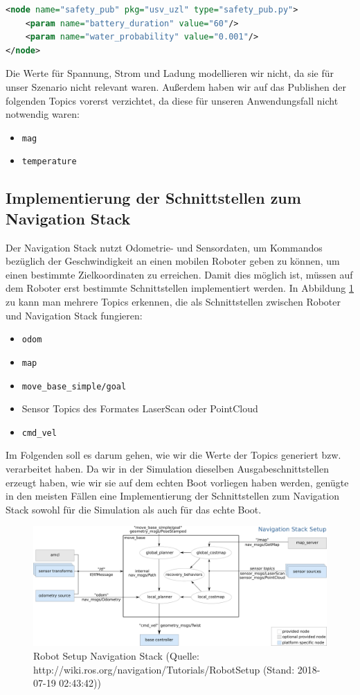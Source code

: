 \documentclass[11pt]{article}
\begin{document}
\begin{lstlisting}[language=xml]
<node name="safety_pub" pkg="usv_uzl" type="safety_pub.py">
    <param name="battery_duration" value="60"/>
    <param name="water_probability" value="0.001"/>
</node>
\end{lstlisting}

Die Werte für Spannung, Strom und Ladung modellieren wir nicht, da sie für unser Szenario nicht relevant waren.
Außerdem haben wir auf das Publishen der folgenden Topics vorerst verzichtet, da diese für unseren Anwendungsfall nicht notwendig waren:
\begin{itemize}
	\item \texttt{mag}
	\item \texttt{temperature}
\end{itemize}

\subsection{Implementierung der Schnittstellen zum Navigation Stack}
Der Navigation Stack nutzt Odometrie- und Sensordaten, um Kommandos bezüglich der Geschwindigkeit an einen mobilen Roboter geben zu können, um einen bestimmte Zielkoordinaten zu erreichen. Damit dies möglich ist, müssen auf dem Roboter erst bestimmte Schnittstellen implementiert werden\cite{NavWiki}. In Abbildung \ref{nav} zu kann man mehrere Topics erkennen, die als Schnittstellen zwischen Roboter und Navigation Stack fungieren:
\begin{itemize}
	\item \texttt{odom}
	\item \texttt{map}
	\item \texttt{move\_base\_simple/goal}
	\item Sensor Topics des Formates LaserScan oder PointCloud
	\item \texttt{cmd\_vel}
\end{itemize}
Im Folgenden soll es darum gehen, wie wir die Werte der Topics generiert bzw. verarbeitet haben. Da wir in der Simulation dieselben Ausgabeschnittstellen erzeugt haben, wie wir sie auf dem echten Boot vorliegen haben werden, genügte in den meisten Fällen eine Implementierung der Schnittstellen zum Navigation Stack sowohl für die Simulation als auch für das echte Boot.

\begin{figure}[h]
	\includegraphics[width=\linewidth]{overview_tf.png}
	\caption{Robot Setup Navigation Stack (Quelle: http://wiki.ros.org/navigation/Tutorials/RobotSetup (Stand: 2018-07-19 02:43:42))}
	\label{nav}
\end{figure}
\end{document}
